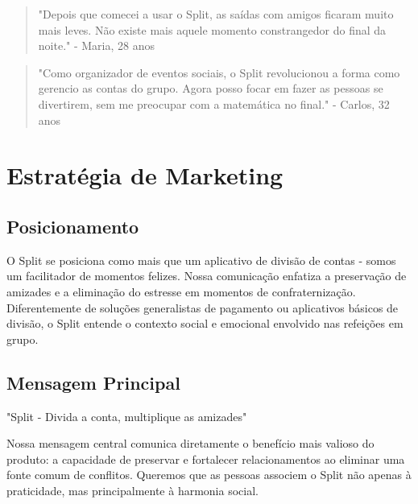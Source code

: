 \documentclass[12pt,a4paper]{article}
\begin{document}
\begin{quote}
"Depois que comecei a usar o Split, as saídas com amigos ficaram muito mais leves. Não existe mais aquele momento constrangedor do final da noite." - Maria, 28 anos
\end{quote}

\begin{quote}
"Como organizador de eventos sociais, o Split revolucionou a forma como gerencio as contas do grupo. Agora posso focar em fazer as pessoas se divertirem, sem me preocupar com a matemática no final." - Carlos, 32 anos
\end{quote}

\section{Estratégia de Marketing}

\subsection{Posicionamento}
O Split se posiciona como mais que um aplicativo de divisão de contas - somos um facilitador de momentos felizes. Nossa comunicação enfatiza a preservação de amizades e a eliminação do estresse em momentos de confraternização. Diferentemente de soluções generalistas de pagamento ou aplicativos básicos de divisão, o Split entende o contexto social e emocional envolvido nas refeições em grupo.

\subsection{Mensagem Principal}
"Split - Divida a conta, multiplique as amizades"

Nossa mensagem central comunica diretamente o benefício mais valioso do produto: a capacidade de preservar e fortalecer relacionamentos ao eliminar uma fonte comum de conflitos. Queremos que as pessoas associem o Split não apenas à praticidade, mas principalmente à harmonia social.
\end{document}
